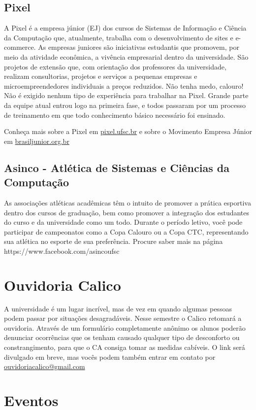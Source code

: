 \documentclass{article}
\begin{document}
\subsection{Pixel}
A Pixel é a empresa júnior (EJ) dos cursos de Sistemas de Informação e Ciência da Computação que, atualmente, trabalha com o desenvolvimento de sites e e-commerce. As empresas juniores são iniciativas estudantis que promovem, por meio da atividade econômica, a vivência empresarial dentro da universidade. São projetos de extensão que, com orientação dos professores da universidade, realizam consultorias, projetos e serviços a pequenas empresas e microempreendedores individuais a preços reduzidos. Não tenha medo, calouro! Não é exigido nenhum tipo de experiência para trabalhar na Pixel. Grande parte da equipe atual entrou logo na primeira fase, e todos passaram por um processo de treinamento em que todo conhecimento básico necessário foi ensinado.

Conheça mais sobre a Pixel em \url{pixel.ufsc.br} e sobre o Movimento Empresa Júnior em \url{brasiljunior.org.br}

\subsection{Asinco - Atlética de Sistemas e Ciências da Computação}
As associações atléticas acadêmicas têm o intuito de promover a prática esportiva dentro dos cursos de graduação, bem como promover a integração dos estudantes do curso e da universidade como um todo. Durante o período letivo, você pode participar de campeonatos como a Copa Calouro ou a Copa CTC, representando sua atlética no esporte de sua preferência. Procure saber mais na página https://www.facebook.com/asincoufsc

\section{Ouvidoria Calico} 
A universidade é um lugar incrível, mas de vez em quando algumas pessoas podem passar por situações desagradáveis. Nesse semestre o Calico retomará a ouvidoria. Através de um formulário completamente anônimo os alunos poderão denunciar ocorrências que os tenham causado qualquer tipo de desconforto ou constrangimento, para que o CA consiga tomar as medidas cabíveis. O link será divulgado em breve, mas vocês podem também entrar em contato por \url{ouvidoriacalico@gmail.com}

\section{Eventos}
\end{document}
